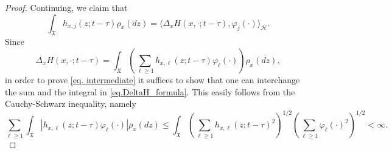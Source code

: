 \documentclass[10pt,a4paper]{amsart}
\newcommand{\X}{\mathfrak{X}}
\begin{document}
\begin{proof}
Continuing, we claim that
\begin{equation}\label{eq. intermediate}
\int_\X  h_{x,j}(z;t-\tau) \rho_x(dz) = \langle \Delta_xH(x,\cdot;t-\tau),\varphi_j(\cdot) \rangle_\mathcal{H}.
\end{equation}
Since
\begin{equation}\label{eq.DeltaH_formula}
\Delta_xH(x,\cdot;t-\tau) = \int_\X \left(\sum_{\ell\geq 1} h_{x,\ell}(z;t-\tau) \varphi_\ell (\cdot)\right) \rho_x(dz),
\end{equation}
in order to prove \eqref{eq. intermediate} it suffices to show that one can interchange the sum and the integral in \eqref{eq.DeltaH_formula}.
This easily follows from the Cauchy-Schwarz inequality, namely
$$
\sum_{\ell\geq 1} \int_\X \left| h_{x,\ell}(z;t-\tau) \varphi_\ell (\cdot) \right| \rho_x(dz)\leq \int_\X \left( \sum_{\ell\geq 1} h_{x,\ell}(z;t-\tau)^2\right)^{1/2}  \left( \sum_{\ell\geq 1} \varphi_\ell(\cdot)^2\right)^{1/2} <\infty.
$$


\end{proof}
\end{document}
